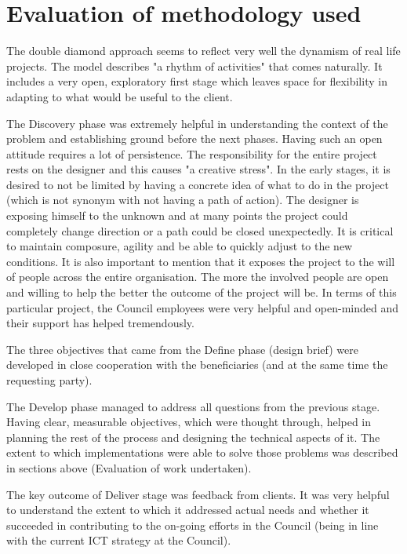 	\section{Evaluation of methodology used}

The double diamond approach seems to reflect very well the dynamism of real life projects. The model describes "a rhythm of activities" that comes naturally. It includes a very open, exploratory first stage which leaves space for flexibility in adapting to what would be useful to the client.

The Discovery phase was extremely helpful in understanding the context of the problem and establishing ground before the next phases. Having such an open attitude requires a lot of persistence. The responsibility for the entire project rests on the designer and this causes "a creative stress". In the early stages, it is desired to not be limited by having a concrete idea of what to do in the project (which is not synonym with not having a path of action). The designer is exposing himself to the unknown and at many points the project could completely change direction or a path could be closed unexpectedly. It is critical to maintain composure, agility and be able to quickly adjust to the new conditions. It is also important to mention that it exposes the project to the will of people across the entire organisation. The more the involved people are open and willing to help the better the outcome of the project will be. In terms of this particular project, the Council employees were very helpful and open-minded and their support has helped tremendously.

The three objectives that came from the Define phase (design brief) were developed in close cooperation with the beneficiaries (and at the same time the requesting party).

The Develop phase managed to address all questions from the previous stage. Having clear, measurable objectives, which were thought through, helped in planning the rest of the process and designing the technical aspects of it. The extent to which implementations were able to solve those problems was described in sections above (Evaluation of work undertaken).

The key outcome of Deliver stage was feedback from clients. It was very helpful to understand the extent to which it addressed actual needs and whether it succeeded in contributing to the on-going efforts in the Council (being in line with the current ICT strategy at the Council).